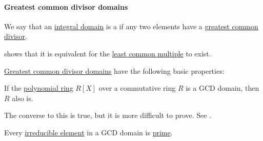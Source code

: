 \paragraph{Greatest common divisor domains}

\begin{definition}\label{def:gcd_domain}
  We say that an \hyperref[def:integral_domain]{integral domain} is a  if any two elements have a \hyperref[def:gcd]{greatest common divisor}.

   shows that it is equivalent for the \hyperref[def:lcm]{least common multiple} to exist.
\end{definition}

\begin{proposition}\label{thm:def:gcd_domain}
  \hyperref[def:gcd_domain]{Greatest common divisor domains} have the following basic properties:
  \begin{thmenum}
     If the \hyperref[def:polynomial_algebra]{polynomial ring} \( R[X] \) over a commutative ring \( R \) is a GCD domain, then \( R \) also is.

    The converse to this is true, but it is more difficult to prove. See .

     Every \hyperref[def:domain_divisibility/irreducible]{irreducible element} in a GCD domain is \hyperref[def:domain_divisibility/prime]{prime}.
  \end{thmenum}
\end{proposition}

